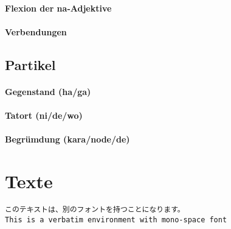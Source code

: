 \documentclass[justified, a4paper, notitlepage, captions=tableheading, nobib]{tufte-handout}
\begin{document}
\paragraph{Flexion der na-Adjektive}
\label{sec:orgaa885b3}

\paragraph{Verbendungen}
\label{sec:org4d989d5}

\subsection{Partikel }
\label{sec:orgc0735e2}

\paragraph{Gegenstand (ha/ga)}
\label{sec:org434c50b}

\paragraph{Tatort (ni/de/wo)}
\label{sec:org61c50ff}

\paragraph{Begrümdung (kara/node/de)}
\label{sec:org6b3ef78}

\newpage
\section{Texte}
\label{sec:org3064e87}

\begin{center}
\end{center}

\begin{verbatim}
このテキストは、別のフォントを持つことになります。
This is a verbatim environment with mono-space font
\end{verbatim}
\end{document}
